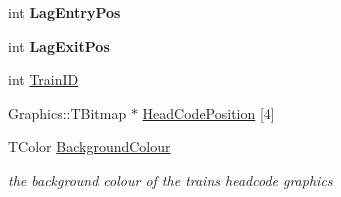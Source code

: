 \begin{DoxyCompactItemize}
int {\bfseries Lag\+Entry\+Pos}
\item 
\mbox{\label{class_t_train_a79b51b68b8e6c0f48330aaf3a99ee5c6}} 
int {\bfseries Lag\+Exit\+Pos}
\item 
int \mbox{\hyperlink{class_t_train_a95a26f26e890d53e38f1f8067977ef0e}{Train\+ID}}
\item 
Graphics\+::\+T\+Bitmap $\ast$ \mbox{\hyperlink{class_t_train_a9b4cfd30341ab156b539eb3a5a9fe7a3}{Head\+Code\+Position}} \mbox{[}4\mbox{]}
\item 
\mbox{\label{class_t_train_acee68f1e0863f2dc008a69f9c4be0fe6}} 
T\+Color \mbox{\hyperlink{class_t_train_acee68f1e0863f2dc008a69f9c4be0fe6}{Background\+Colour}}
\begin{DoxyCompactList}\small\item\em the background colour of the train\textquotesingle{}s headcode graphics \end{DoxyCompactList}\end{DoxyCompactItemize}
